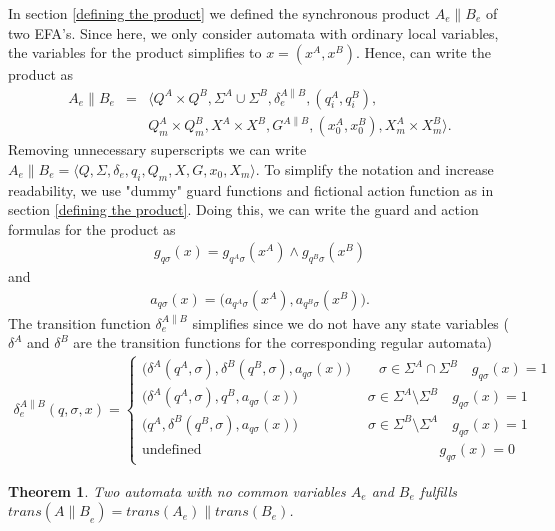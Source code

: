 \documentclass{article}
\newtheorem{theorem}{Theorem}
\begin{document}
In section \ref{defining the product} we defined the synchronous product $A_e\|B_e$
of two EFA's. Since here, we only consider automata with ordinary local variables,
the variables for the product simplifies to $x=(x^A,x^B)$. Hence, can write the product as
\begin{eqnarray}
A_e\|B_e&=&\langle Q^A\times Q^B, \Sigma^A \cup \Sigma^B ,
\delta^{A\|B}_e, (q^A_i,q^B_i) ,\nonumber\\
&& Q^A_m\times Q^B_m, X^A \times X^B, G^{A\|B},(x^A_0,x^B_0),
X^A_m \times X^B_m \rangle.
\end{eqnarray}
Removing unnecessary  superscripts we can write $A_e\|B_e=\langle
Q, \Sigma, \delta_e, q_i, Q_m, X, G ,x_0, X_m \rangle$. To simplify the
notation and increase readability, we use "dummy" guard functions
and fictional action function as in section \ref{defining the product}.
Doing this, we can write the guard and action formulas for the product as
\begin{eqnarray}
g_{q \sigma}(x)= g_{q^A\sigma}(x^{A})\wedge g_{q^B\sigma}(x^{B})
\end{eqnarray}
and
\begin{eqnarray}
a_{q \sigma}(x)=
 \big(a_{q^A \sigma}(x^{A}), a_{q^B \sigma}(x^{B})\big).
\end{eqnarray}
The transition function $\delta^{A\|B}_e$ simplifies since we do not have any
state variables ($\delta^A$ and $\delta^B$ are the transition functions
for the corresponding regular automata)
\begin{eqnarray}
\delta^{A\|B}_e(q,\sigma,x)=\left\{
\begin{array}{ll}
\big(\delta^A(q^A,\sigma),\delta^B(q^B,\sigma),a_{q \sigma}(x)\big) \quad\quad \sigma\in \Sigma^A \cap \Sigma^B \quad g_{q \sigma}(x)=1\\
\big(\delta^A(q^A,\sigma),q^B,a_{q \sigma}(x)\big) \quad\quad\quad\quad\quad \sigma\in \Sigma^A \setminus \Sigma^B \quad g_{q \sigma}(x)=1\\
\big(q^A,\delta^B(q^B,\sigma),a_{q \sigma}(x)\big) \quad\quad\quad\quad\quad \sigma\in \Sigma^B \setminus \Sigma^A \quad g_{q \sigma}(x)=1\\
\textrm{
undefined}\quad\quad\quad\quad\quad\quad\quad\quad\quad\quad\quad\quad\quad\quad\quad\quad\quad
g_{q\sigma}(x)=0
\end{array}\right.
\end{eqnarray}


\begin{theorem}
Two automata with no common variables $A_e$ and $B_e$ fulfills
$trans({A\|B}_e) =trans(A_e)\|trans(B_e)$.
\end{theorem}
\end{document}
